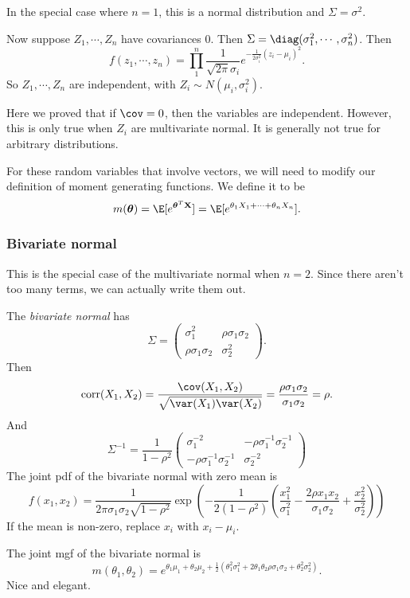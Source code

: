 \documentclass[a4paper]{article}
\begin{document}
In the special case where $n = 1$, this is a normal distribution and $\Sigma = \sigma^2$.

Now suppose $Z_1, \cdots, Z_n$ have covariances $0$. Then $\Sigma = \diag(\sigma_1^2, \cdots, \sigma_n^2)$. Then
\[
  f(z_1, \cdots, z_n) = \prod_1^n \frac{1}{\sqrt{2\pi}\sigma_i} e^{-\frac{1}{2\sigma_i^2}(z_i - \mu_i)^2}.
\]
So $Z_1, \cdots, Z_n$ are independent, with $Z_i\sim N(\mu_i, \sigma_i^2)$.

Here we proved that if $\cov = 0$, then the variables are independent. However, this is only true when $Z_i$ are multivariate normal. It is generally not true for arbitrary distributions.

For these random variables that involve vectors, we will need to modify our definition of moment generating functions. We define it to be
\[
  m(\boldsymbol\theta) = \E[e^{\boldsymbol\theta^T \mathbf{X}}] = \E[e^{\theta_1 X_1 + \cdots + \theta_n X_n}].
\]
\subsubsection*{Bivariate normal}
This is the special case of the multivariate normal when $n = 2$. Since there aren't too many terms, we can actually write them out.

The \emph{bivariate normal} has
\[
  \Sigma=
  \begin{pmatrix}
    \sigma_1^2 & \rho\sigma_1\sigma_2\\
    \rho\sigma_1\sigma_2 & \sigma_2^2
  \end{pmatrix}.
\]
Then
\[
  \mathrm{corr}(X_1, X_2) = \frac{\cov(X_1, X_2)}{\sqrt{\var(X_1)\var(X_2)}} = \frac{\rho\sigma_1\sigma_2}{\sigma_1\sigma_2} = \rho.
\]
And
\[
  \Sigma^{-1} = \frac{1}{1 - \rho^2}
  \begin{pmatrix}
    \sigma_1^{-2} & -\rho\sigma_1^{-1}\sigma_2^{-1}\\
    -\rho\sigma_1^{-1}\sigma_2^{-1} & \sigma_2^{-2}
  \end{pmatrix}
\]
The joint pdf of the bivariate normal with zero mean is
\[
  f(x_1, x_2) = \frac{1}{2\pi \sigma_1 \sigma_2 \sqrt{1 - \rho^2}} \exp\left(-\frac{1}{2(1 - \rho^2)}\left(\frac{x_1^2}{\sigma_1^2} - \frac{2\rho x_1x_2}{\sigma_1\sigma_2} + \frac{x_2^2}{\sigma_2^2}\right)\right)
\]
If the mean is non-zero, replace $x_i$ with $x_i - \mu_i$.

The joint mgf of the bivariate normal is
\[
  m(\theta_1, \theta_2) = e^{\theta_1\mu_1 + \theta_2 \mu_2 + \frac{1}{2}(\theta_1^2\sigma_1^2 + 2\theta_1\theta_2\rho\sigma_1\sigma_2 + \theta_2^2\sigma_2^2)}.
\]
Nice and elegant.
\end{document}
